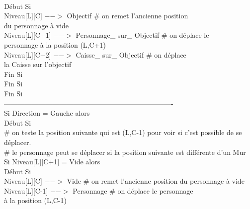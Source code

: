 \documentclass{article}
\begin{document}
\begin{tabbing}
\\	\hspace{4cm}		Début Si
\\	\hspace{5cm}			Niveau[L][C] $-->$ Objectif 			\# on remet l'ancienne position
\\ \hspace{5cm} du personnage à vide
\\	\hspace{5cm}			Niveau[L][C+1] $-->$ Personnage\_ sur\_ Objectif	\# on déplace le
\\ \hspace{5cm} personnage à la position (L,C+1)
\\	\hspace{5cm}			Niveau[L][C+2] $-->$ Caisse\_ sur\_ Objectif		\# on déplace
\\ \hspace{5cm} la Caisse sur l'objectif
\\	\hspace{4cm}		Fin Si
\\	\hspace{3cm}	Fin Si 
\\	\hspace{2cm}  Fin Si 
\\   			-------------------------------------------------------------------------
\\	\hspace{2cm} Si Direction = Gauche  alors   
\\	\hspace{2cm} Début Si
\\	\hspace{3cm}	\# on teste la position suivante qui est (L,C-1)	pour voir si c'est possible de se déplacer.
\\	\hspace{3cm}	\# le personnage peut se déplacer si la position suivante est différente d'un Mur			
\\	\hspace{3cm}	Si Niveau[L][C+1] = Vide alors			
\\	\hspace{3cm}	Début Si
\\	\hspace{4cm}		Niveau[L][C] $-->$ Vide 		\# on remet l'ancienne position du personnage à vide
\\	\hspace{4cm}		Niveau[L][C-1] $-->$ Personnage	\# on déplace le personnage
\\ \hspace{4cm} à la position (L,C-1)

\end{tabbing}
\end{document}
